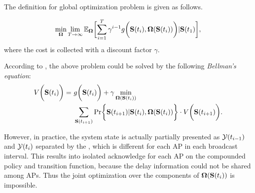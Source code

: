 The definition for global optimization problem is given as follows.
\begin{problem}
    \begin{align}
        \min_{\Policy} \lim_{T \to \infty}
            \mathbb{E}_{\Policy}
                \Bracket{\sum_{i=1}^{T} \gamma^{i-1} g\Paren{\Stat(t_{i}), \Policy(\Stat(t_{i}))}|\Stat(t_1)},
    \end{align}
    where the cost is collected with a discount factor $\gamma$.
\end{problem}
According to \cite{sutton1998introduction}, the above problem could be solved by the following \emph{Bellman's equation}:
\begin{align}
    V\Paren{\Stat(t_{i})} =~&g\Paren{\Stat(t_{i})} + \gamma \min_{\Policy(\Stat(t_{i}))}
        \nonumber\\
        &\sum_{\Stat(t_{i+1})} \Pr\Brace{ \Stat(t_{i+1})|\Stat(t_{i}), \Policy(\Stat(t_{i})) } \cdot V\Paren{\Stat(t_{i+1})}.
    \label{sp_0}
\end{align}

However, in practice, the system state is actually partially presented as $\mathcal{Y}(t_{i-1})$ and $\mathcal{Y}(t_{i})$ separated by the \brdelay, which is different for each AP in each broadcast interval.
This results into isolated acknowledge for each AP on the compounded policy and transition function, because the delay information could not be shared among APs.
Thus the joint optimization over the components of $\boldsymbol{\Omega}(\mathbf{S}(t_{i}))$ is impossible.

